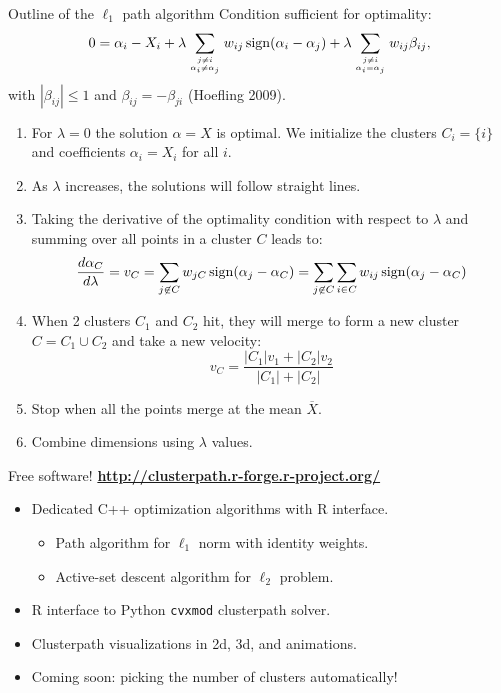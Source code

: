\documentclass[final]{beamer}
\begin{document}
\begin{frame}{}
\begin{columns}[T]
\begin{column}{0.315\linewidth}
\begin{block}{Outline of the $\ell_1$ path algorithm}
Condition sufficient for optimality:
$$0 = \alpha_i - X_i + 
\lambda \sum_{j\neq i\atop \alpha_i \neq \alpha_j}w_{ij}
\operatorname{sign}({\alpha_i-\alpha_j}) + 
\lambda \sum_{j\neq i \atop \alpha_i = \alpha_j}w_{ij} \beta_{ij},$$
with $|\beta_{ij}|\leq 1$ and $\beta_{ij}=-\beta_{ji}$ (Hoefling 2009).
\begin{enumerate}
\item For $\lambda=0$ the solution $\alpha=X$ is optimal. We
  initialize the clusters $C_i = \{i\}$ and coefficients $\alpha_i =
  X_i$ for all $i$.
\item As $\lambda$ increases, the solutions will follow straight
  lines.
\item Taking the derivative of the optimality condition with respect
  to $\lambda$ and summing over all points in a cluster $C$ leads to:
$$\frac {d\alpha_C}{d\lambda}=v_C = \sum_{j\not\in C}w_{jC}\operatorname{sign}(\alpha_j-\alpha_C)=\sum_{j\not\in C}\sum_{i\in C} w_{ij}\operatorname{sign}(\alpha_j-\alpha_C)$$
\item When 2 clusters $C_1$ and $C_2$ hit, they will merge to form a
  new cluster $C = C_1\cup C_2$ and take a new velocity:
$$v_C = \frac{
|C_1|v_1 + |C_2|v_2
}{
|C_1|+|C_2|
}$$
\item Stop when all the points merge at the mean $\overline X$.
\item Combine dimensions using $\lambda$ values.
\end{enumerate}

\end{block}



\begin{alertblock}{Free software!
    \textbf{\url{http://clusterpath.r-forge.r-project.org/}}}
\begin{itemize}
\item Dedicated C++ optimization algorithms with R interface.
  \begin{itemize}
  \item Path algorithm for $\ell_1$ norm with identity weights.
  \item Active-set descent algorithm for $\ell_2$ problem.
  \end{itemize}
\item R interface to Python \texttt{cvxmod} clusterpath solver.
\item Clusterpath visualizations in 2d, 3d, and animations.
\item Coming soon: picking the number of clusters automatically!
\end{itemize}
\end{alertblock}


\end{column}
\end{columns}
\end{frame}
\end{document}
